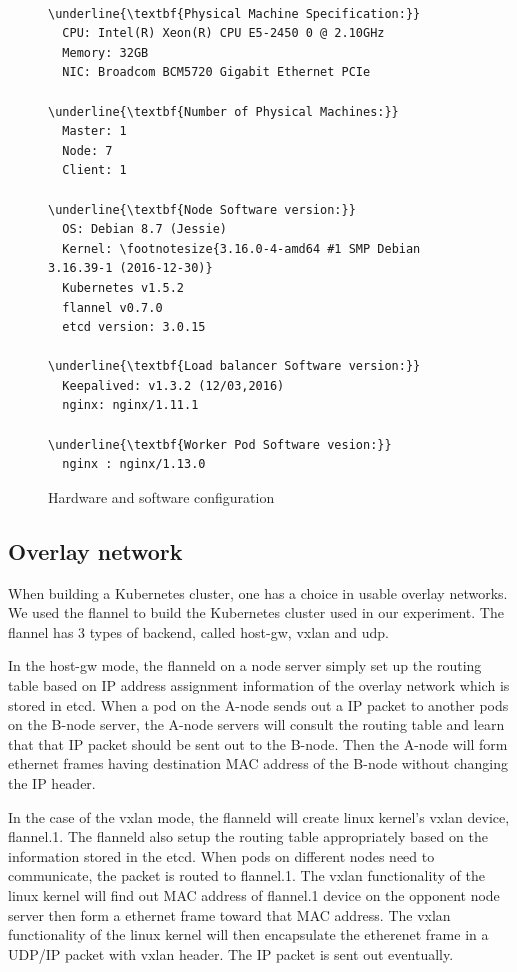 \begin{figure}
\begin{minipage}{0.9\columnwidth}
\small
\begin{Verbatim}[commandchars=\\\{\}]

\underline{\textbf{Physical Machine Specification:}}
  CPU: Intel(R) Xeon(R) CPU E5-2450 0 @ 2.10GHz
  Memory: 32GB
  NIC: Broadcom BCM5720 Gigabit Ethernet PCIe

\underline{\textbf{Number of Physical Machines:}}
  Master: 1
  Node: 7
  Client: 1

\underline{\textbf{Node Software version:}}
  OS: Debian 8.7 (Jessie)
  Kernel: \footnotesize{3.16.0-4-amd64 #1 SMP Debian 3.16.39-1 (2016-12-30)}
  Kubernetes v1.5.2
  flannel v0.7.0
  etcd version: 3.0.15

\underline{\textbf{Load balancer Software version:}}
  Keepalived: v1.3.2 (12/03,2016)
  nginx: nginx/1.11.1

\underline{\textbf{Worker Pod Software vesion:}}
  nginx : nginx/1.13.0 

\end{Verbatim}
\end{minipage}
\caption{Hardware and software configuration}
\label{fig:Hardware and software configuration}
\end{figure}


\subsection{Overlay network}

When building a Kubernetes cluster, one has a choice in usable overlay networks.
We used the flannel to build the Kubernetes cluster used in our experiment. 
The flannel has 3 types of backend, called host-gw, vxlan and udp\cite{CoreOSFlannelBackend}.

In the host-gw mode, the flanneld on a node server simply set up the routing table 
based on IP address assignment information of the overlay network which is stored in etcd. 
When a pod on the A-node sends out a IP packet to another pods on the B-node server, 
the A-node servers will consult the routing table and learn that that IP packet should be sent out to the B-node.
Then the A-node will form ethernet frames having destination MAC address of the B-node without changing the IP header.

In the case of the vxlan mode, the flanneld will create linux kernel's vxlan device, flannel.1. 
The flanneld also setup the routing table appropriately based on the information stored in the etcd.
When pods on different nodes need to communicate, the packet is routed to flannel.1.
The vxlan functionality of the linux kernel will find out MAC address of flannel.1 device on the opponent node server 
then form a ethernet frame toward that MAC address.
The vxlan functionality of the linux kernel will then encapsulate the etherenet frame in a UDP/IP packet with vxlan header.
The IP packet is sent out eventually.

